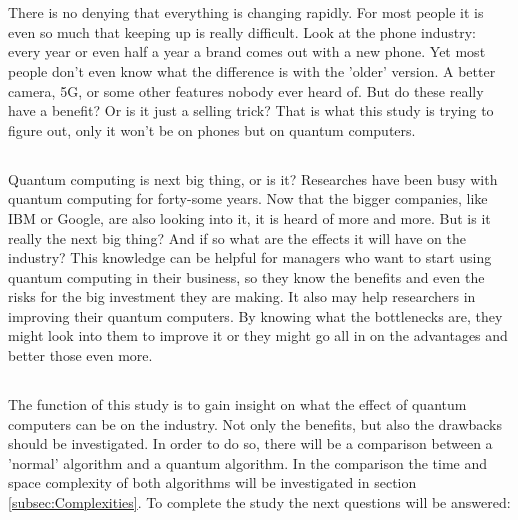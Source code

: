
\chapter{}
\label{ch:inleiding}

There is no denying that everything is changing rapidly. For most people it is even so much that keeping up is really difficult.
Look at the phone industry: every year or even half a year a brand comes out with a new phone. Yet most people don't even know what the difference is with the 'older' version.
A better camera, 5G, or some other features nobody ever heard of. But do these really have a benefit? Or is it just a selling trick?
That is what this study is trying to figure out, only it won't be on phones but on quantum computers.

\section{}
\label{sec:probleemstelling}
Quantum computing is next big thing, or is it? Researches have been busy with quantum computing for forty-some years.
Now that the bigger companies, like IBM or Google, are also looking into it, it is heard of more and more. 
But is it really the next big thing? And if so what are the effects it will have on the industry?
This knowledge can be helpful for managers who want to start using quantum computing in their business, so they know the benefits and even the risks for the big investment they are making.
It also may help researchers in improving their quantum computers. By knowing what the bottlenecks are, they might look into them to improve it or they might go all in on the advantages and better those even more.

\section{}
\label{sec:onderzoeksvraag}

The function of this study is to gain insight on what the effect of quantum computers can be on the industry.
Not only the benefits, but also the drawbacks should be investigated. In order to do so, there will be a comparison between a 'normal' algorithm and a quantum algorithm.
In the comparison the time and space complexity of both algorithms will be investigated in section \ref*{subsec:Complexities}.
To complete the study the next questions will be answered:

